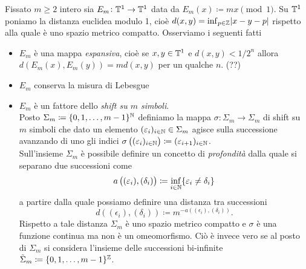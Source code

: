 \begin{example}
	Fissato $ m \geq 2 $ intero sia $ E_m \colon \mathbb{T}^1 \to \mathbb{T}^1 $ data da $ E_m(x) \coloneqq mx \pmod{1} $. Su $ \mathbb{T}^1 $ poniamo la distanza euclidea modulo 1, cioè $ d(x, y) = \inf_{p \in \mathbb{Z}} \abs{x - y - p} $ rispetto alla quale è uno spazio metrico compatto. Osserviamo i seguenti fatti
	\begin{itemize}
		\item $ E_m $ è una mappa \emph{espansiva}, cioè se $ x, y \in \mathbb{T}^1 $ e $ d(x, y) < 1/2^n $ allora $ d(E_m(x), E_m(y)) = m d(x, y) $ per un qualche $ n $. (??)
		\item $ E_m $ conserva la misura di Lebesgue 
		\item $ E_m $ è un fattore dello \emph{shift su $ m $ simboli}. \\
		Posto $ \Sigma_m \coloneqq \{0, 1, \ldots, m-1\}^{\mathbb{N}} $ definiamo la mappa $ \sigma \colon \Sigma_m \to \Sigma_m $ di shift su $ m $ simboli che dato un elemento $ (\varepsilon_i)_{i \in \mathbb{N}} \in \Sigma_m $ agisce sulla successione avanzando di uno gli indici $ \sigma\left((\varepsilon_i)_{i \in \mathbb{N}}\right) \coloneqq (\varepsilon_{i + 1})_{i \in \mathbb{N}} $. \\
		Sull'insieme $ \Sigma_m $ è possibile definire un concetto di \emph{profondità} dalla quale si separano due successioni come 
		\[
			a\left((\varepsilon_i), (\delta_i)\right) \coloneqq \inf_{i \in \mathbb{N}} \{\varepsilon_i \neq \delta_i\}
		\]
		a partire dalla quale possiamo definire una distanza tra successioni 
		\[
			d\left((\epsilon_i), (\delta_i)\right) \coloneqq m^{-a\left((\epsilon_i), (\delta_i)\right)}. 
		\]
		Rispetto a tale distanza $ \Sigma_m $ è uno spazio metrico compatto e $ \sigma $ è una funzione continua ma non è un omeomorfismo. Ciò è invece vero se al posto di $ \Sigma_m $ si considera l'insieme delle successioni bi-infinite $ \tilde{\Sigma}_m \coloneqq \{0, 1, \ldots, m-1\}^{\mathbb{Z}} $. 
	\end{itemize}
\end{example}

